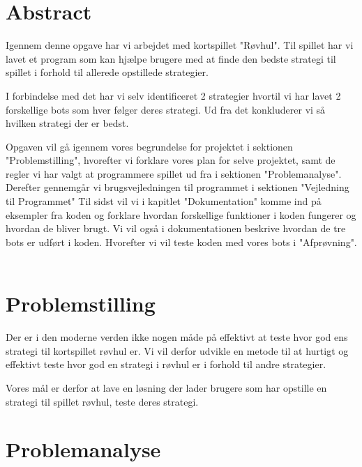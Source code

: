 \documentclass[a4paper, 12pt]{article}
\begin{document}
\begin{multicols}{2}

\section{Abstract}

Igennem denne opgave har vi arbejdet med kortspillet "Røvhul". Til spillet har vi lavet et program som kan hjælpe brugere med at finde den bedste strategi til spillet i forhold til allerede opstillede strategier. 

I forbindelse med det har vi selv identificeret 2 strategier hvortil vi har lavet 2 forskellige bots som hver følger deres strategi. Ud fra det konkluderer vi så hvilken strategi der er bedst.

Opgaven vil gå igennem vores begrundelse for projektet i sektionen "Problemstilling", hvorefter vi forklare vores plan for selve projektet, samt de regler vi har valgt at programmere spillet ud fra i sektionen "Problemanalyse". 
\bigbreak
Derefter gennemgår vi brugsvejledningen til programmet i sektionen "Vejledning til Programmet"
\bigbreak
Til sidst vil vi i kapitlet "Dokumentation" komme ind på eksempler fra koden og forklare hvordan forskellige funktioner i koden fungerer og hvordan de bliver brugt. Vi vil også i dokumentationen beskrive hvordan de tre bots er udført i koden. Hvorefter vi vil teste koden med vores bots i "Afprøvning".
\\
\\

\section{Problemstilling}
Der er i den moderne verden ikke nogen måde på effektivt at teste hvor god ens strategi til kortspillet røvhul er. Vi vil derfor udvikle en metode til at hurtigt og effektivt teste hvor god en strategi i røvhul er i forhold til andre strategier.

Vores mål er derfor at lave en løsning der lader brugere som har opstille en strategi til spillet røvhul, teste deres strategi.

\section{Problemanalyse}


\end{multicols}
\end{document}
